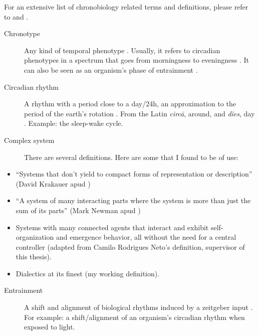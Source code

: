\begin{termos}

For an extensive list of chronobiology related terms and definitions,
please refer to \textcite{aschoff1965} and \textcite{marques2012}.

\begin{description}
\item[Chronotype]
\hspace{20cm}

Any kind of temporal phenotype \autocite{ehret1974,pittendrigh1993}.
Usually, it refers to circadian phenotypes in a spectrum that goes from
morningness to eveningness \autocite{roenneberg2003}. It can also be
seen as an organism's phase of entrainment \autocite{roenneberg2012a}.
\item[Circadian rhythm]
\hspace{20cm}

A rhythm with a period close to a day/24h, an approximation to the
period of the earth's rotation \autocite{pittendrigh1960}. From the
Latin \emph{circā}, around, and \emph{dĭes}, day \autocite{latinitium}.
Example: the sleep-wake cycle.
\item[Complex system]
\hspace{20cm}

There are several definitions. Here are some that I found to be of use:
\end{description}

\begin{itemize}
\tightlist
\item
  ``Systems that don't yield to compact forms of representation or
  description'' (David Krakauer apud \textcite{mitchell2013})
\item
  ``A system of many interacting parts where the system is more than
  just the sum of its parts'' (Mark Newman apud \textcite{mitchell2013})
\item
  Systems with many connected agents that interact and exhibit
  self-organization and emergence behavior, all without the need for a
  central controller (adapted from Camilo Rodrigues Neto's definition,
  supervisor of this thesis).
\item
  Dialectics at its finest (my working definition).
\end{itemize}

\begin{description}
\item[Entrainment]
\hspace{20cm}

A shift and alignment of biological rhythms induced by a zeitgeber input
\autocite{kuhlman2018}. For example: a shift/alignment of an organism's
circadian rhythm when exposed to light.
\end{description}

\end{termos}


\tableofcontents*
\cleardoublepage
